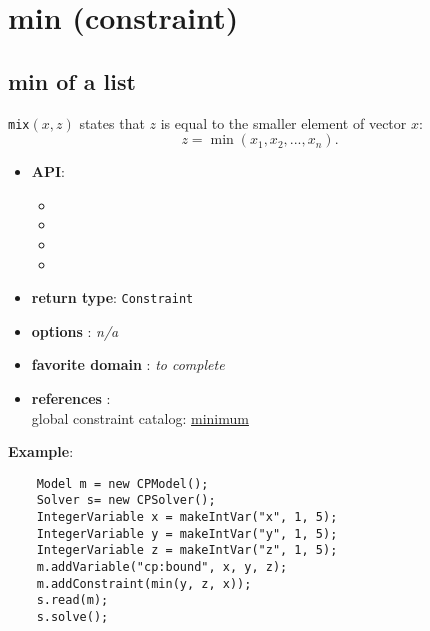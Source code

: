 \label{min}
\hypertarget{min}{}

\section{min (constraint)}\label{min:minconstraint}\hypertarget{min:minconstraint}{}

\subsection{min of a list}\label{min:minofalist}\hypertarget{min:minofalist}{}

\begin{notedef}
  \texttt{mix}$(x,z)$ states that $z$ is equal to the smaller element
  of vector $x$:
$$z = \min(x_1, x_2, ..., x_n).$$
\end{notedef}
\begin{itemize}
	\item \textbf{API}:
	\begin{itemize}
		\item {}
		\item {}
		\item {}
		\item {}
	\end{itemize}
	\item \textbf{return type}: \texttt{Constraint}
	\item \textbf{options} : \emph{n/a}
	\item \textbf{favorite domain} : \emph{to complete}
	\item \textbf{references} :\\
      global constraint catalog: \href{http://www.emn.fr/x-info/sdemasse/gccat/Cminimum.html}{minimum}
\end{itemize}

\textbf{Example}:
\begin{lstlisting}
	Model m = new CPModel();
	Solver s= new CPSolver();
	IntegerVariable x = makeIntVar("x", 1, 5);
	IntegerVariable y = makeIntVar("y", 1, 5);
	IntegerVariable z = makeIntVar("z", 1, 5);
	m.addVariable("cp:bound", x, y, z);
	m.addConstraint(min(y, z, x));
	s.read(m);
	s.solve();
\end{lstlisting}

